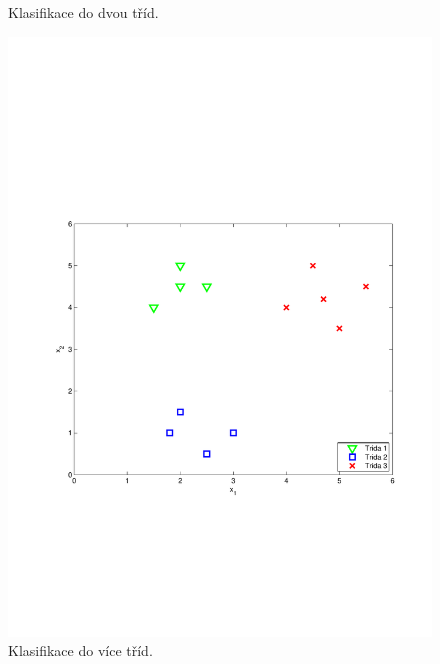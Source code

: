 {\begin{figure}[!ht]
\begin{minipage}[b]{0.48\textwidth}
  		\caption{Klasifikace do dvou tříd.}
		\label{fig:oneVSall_one}
	\end{minipage}%
	\hfill
	\begin{minipage}[b]{0.48\textwidth}
		\includegraphics[width = \textwidth, trim = 2.5cm 7cm 2cm 9cm]{./Img/BinarniRegrese/oneVSallClassification/oneVSall_all.pdf}
  		\caption{Klasifikace do více tříd.}
		\label{fig:oneVSall_all}
	\end{minipage}%
\end{figure}}

